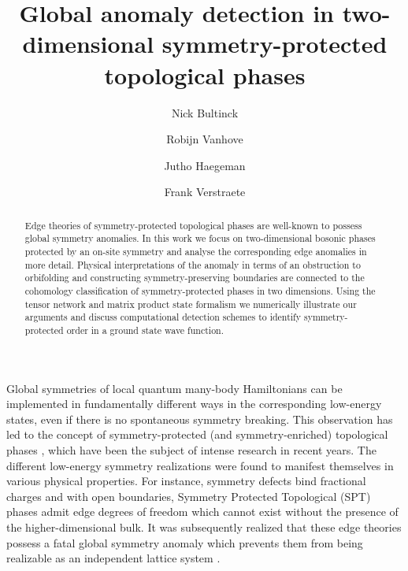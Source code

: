 \documentclass[aps,pra,twocolumn,superscriptaddress,10pt,article,nofootinbib,showpacs]{revtex4-1}
\begin{document}
\title{Global anomaly detection in two-dimensional symmetry-protected topological phases}




\author{Nick Bultinck}
\author{Robijn Vanhove}
\author{Jutho Haegeman}
\author{Frank Verstraete}


\begin{abstract}
Edge theories of symmetry-protected topological phases are well-known to possess global symmetry anomalies. In this work we focus on two-dimensional bosonic phases protected by an on-site symmetry and analyse the corresponding edge anomalies in more detail. Physical interpretations of the anomaly in terms of an obstruction to orbifolding and constructing symmetry-preserving boundaries are connected to the cohomology classification of symmetry-protected phases in two dimensions. Using the tensor network and matrix product state formalism we numerically illustrate our arguments and discuss computational detection schemes to identify symmetry-protected order in a ground state wave function.
\end{abstract}

\maketitle

Global symmetries of local quantum many-body Hamiltonians can be implemented in fundamentally different ways in the corresponding low-energy states, even if there is no spontaneous symmetry breaking. This observation has led to the concept of symmetry-protected (and symmetry-enriched) topological phases \cite{ChenLiu,ChenGu,PollmannBerg,FidkowskiKitaev}, which have been the subject of intense research in recent years. The different low-energy symmetry realizations were found to manifest themselves in various physical properties. For instance, symmetry defects bind fractional charges and with open boundaries, Symmetry Protected Topological (SPT) phases admit edge degrees of freedom which cannot exist without the presence of the higher-dimensional bulk. It was subsequently realized that these edge theories possess a fatal global symmetry anomaly which prevents them from being realizable as an independent lattice system \cite{Wen,KapustinThorngren,WangSantos1}.  
\end{document}
